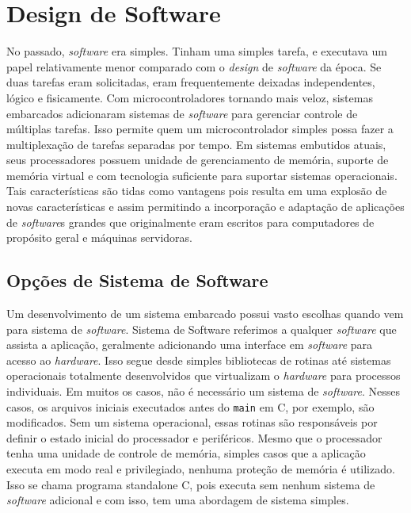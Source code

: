 \section{Design de Software}



No passado, \textit{software} era simples. Tinham uma simples tarefa, e executava um papel relativamente menor comparado com o \textit{design} de \textit{software} da época. Se duas tarefas eram solicitadas, eram frequentemente deixadas independentes, lógico e fisicamente. Com microcontroladores tornando mais veloz, sistemas embarcados adicionaram sistemas de \textit{software} para gerenciar controle de múltiplas tarefas. Isso permite quem um microcontrolador simples possa fazer a multiplexação de tarefas separadas por tempo. Em sistemas embutidos atuais, seus processadores possuem unidade de gerenciamento de memória, suporte de memória virtual e com tecnologia suficiente para suportar sistemas operacionais. Tais características são tidas como vantagens pois resulta em uma explosão de novas características e assim permitindo a incorporação e adaptação de aplicações de \textit{software}s grandes que originalmente eram escritos para computadores de propósito geral e máquinas servidoras.





\subsection{Opções de Sistema de Software}



Um desenvolvimento de um sistema embarcado possui vasto escolhas quando vem para sistema de \textit{software}. Sistema de Software referimos a qualquer \textit{software} que assista a aplicação, geralmente adicionando uma interface em \textit{software} para acesso ao \textit{hardware}. Isso segue desde simples bibliotecas de rotinas até sistemas operacionais totalmente desenvolvidos que virtualizam o \textit{hardware} para processos individuais. Em muitos os casos, não é necessário um sistema de \textit{software}. Nesses casos, os arquivos iniciais executados antes do \texttt{main} em C, por exemplo, são modificados. Sem um sistema operacional, essas rotinas são responsáveis por definir o estado inicial do processador e periféricos. Mesmo que o processador tenha uma unidade de controle de memória,  simples casos que a aplicação executa em modo real e privilegiado, nenhuma proteção de memória é utilizado. Isso se chama programa standalone C, pois executa sem nenhum sistema de \textit{software} adicional e com isso, tem uma abordagem de sistema simples.

